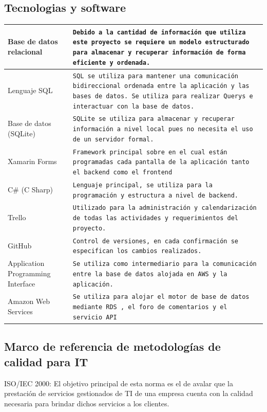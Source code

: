 \documentclass[10pt]{article}
\begin{document}
\subsection{Tecnologias y software}
\begin{table}[H]
\centering
\par\vspace{\baselineskip}
\begin{tabular}{| p{5 cm}| p{11cm} |}
\hline
Base de datos relacional &  \texttt{Debido   a la cantidad de información que utiliza este proyecto se requiere un modelo   estructurado para almacenar y recuperar información de forma eficiente y   ordenada.} \\ \hline
Lenguaje SQL             &  \texttt{SQL   se utiliza para mantener una comunicación bidireccional ordenada entre la   aplicación y las bases de datos. Se utiliza para realizar Querys e   interactuar con la base de datos.} \\ \hline
Base de datos (SQLite)   &  \texttt{SQLite   se utiliza para almacenar y recuperar información a nivel local pues no   necesita el uso de un servidor formal.} \\ \hline
Xamarin Forms  &  \texttt{Framework   principal sobre en el cual están programadas cada pantalla de la aplicación   tanto el backend como el frontend } \\ \hline                                                             
C\# (C Sharp)  &  \texttt{Lenguaje   principal, se utiliza para la programación y estructura a nivel de backend.} \\ \hline   
Trello  &  \texttt{Utilizado para la administración y calendarización de todas las actividades y requerimientos del proyecto.} \\ \hline   
GitHub  &  \texttt{Control de versiones, en cada confirmación se especifican los cambios realizados.} \\ \hline  
Application Programming Interface  &  \texttt{Se utiliza como intermediario para la comunicación entre la base de datos alojada en AWS y la aplicación. } \\ \hline  
Amazon Web Services &  \texttt{Se utiliza para alojar el motor de base de datos mediante RDS , el foro de comentarios y el servicio API } \\ \hline  
\end{tabular}
\end{table}
\subsection{Marco de referencia de metodologías de calidad para IT}
ISO/IEC 2000: El objetivo principal de esta norma es el de avalar que la prestación de servicios gestionados de TI de una empresa cuenta con la calidad necesaria para brindar dichos servicios a los clientes.
\end{document}
